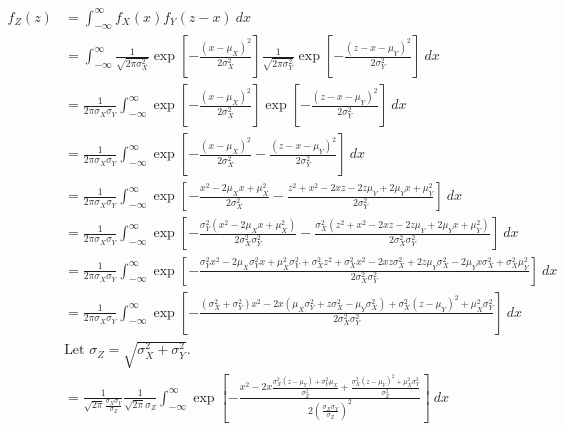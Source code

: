 \documentclass{article}
\begin{document}
{
  \allowdisplaybreaks
\begin{align*}
  f_Z(z) &= \int_{-\infty}^{\infty} f_X(x) f_Y(z - x) \: dx \\
  &= \int_{-\infty}^{\infty} \frac{1}{\sqrt{2 \pi \sigma_X^2}} \exp \left[{-\frac{(x - \mu_X)^2}{2 \sigma_X^2}} \right] \frac{1}{\sqrt{2 \pi \sigma_Y^2}} \exp \left[{-\frac{(z - x - \mu_Y)^2}{2 \sigma_Y^2}} \right] \: dx \\[10pt]
  &= \frac{1}{2 \pi \sigma_X \sigma_Y} \int_{-\infty}^{\infty} \exp \left[{-\frac{(x - \mu_X)^2}{2 \sigma_X^2}} \right] \exp \left[{-\frac{(z - x - \mu_Y)^2}{2 \sigma_Y^2}} \right] \: dx \\[10pt]
  &= \frac{1}{2 \pi \sigma_X \sigma_Y} \int_{-\infty}^{\infty} \exp\left[{-\frac{(x - \mu_X)^2}{2 \sigma_X^2} - \frac{(z - x - \mu_Y)^2}{2 \sigma_Y^2}} \right] \: dx \\[10pt]
  &= \frac{1}{2 \pi \sigma_X \sigma_Y} \int_{-\infty}^{\infty} \exp\left[{-\frac{x^2 - 2 \mu_X x + \mu_X^2}{2 \sigma_X^2} - \frac{z^2 + x^2 - 2 x z - 2 z \mu_Y + 2 \mu_Y x + \mu_Y^2}{2 \sigma_Y^2}} \right] \: dx \\[10pt]
  &= \frac{1}{2 \pi \sigma_X \sigma_Y} \int_{-\infty}^{\infty} \exp\left[{-\frac{\sigma_Y^2(x^2 - 2 \mu_X x + \mu_X^2)}{2 \sigma_X^2 \sigma_Y^2} - \frac{\sigma_X^2(z^2 + x^2 - 2 x z - 2 z \mu_Y + 2 \mu_Y x + \mu_Y^2)}{2 \sigma_X^2 \sigma_Y^2 }} \right] \: dx \\[10pt]
  &= \frac{1}{2 \pi \sigma_X \sigma_Y} \int_{-\infty}^{\infty} \exp\left[{-\frac{\sigma_Y^2 x^2 - 2 \mu_X \sigma_Y^2 x + \mu_X^2 \sigma_Y^2 + \sigma_X^2 z^2 + \sigma_X^2 x^2 - 2xz\sigma_X^2 + 2 z \mu_Y \sigma_X^2 - 2\mu_Y x \sigma_X^2 + \sigma_X^2 \mu_Y^2}{2 \sigma_X^2 \sigma_Y^2}} \right] \: dx \\[10pt]
  &= \frac{1}{2 \pi \sigma_X \sigma_Y} \int_{-\infty}^{\infty} \exp\left[{-\frac{\left(\sigma_X^2 + \sigma_Y^2\right) x^2 - 2 x \left( \mu_X \sigma_Y^2 + z \sigma_X^2 - \mu_Y \sigma_X^2 \right) + \sigma_X^2 \left( z - \mu_Y \right)^2 + \mu_X^2 \sigma_Y^2}{2 \sigma_X^2 \sigma_Y^2}} \right] \: dx \\[10pt]
  &\text{Let $\sigma_Z = \sqrt{\sigma_X^2 + \sigma_Y^2}$}. \\
  &= \frac{1}{\sqrt{2 \pi} \frac{\sigma_X \sigma_Y}{\sigma_Z}} \frac{1}{\sqrt{2 \pi} \sigma_Z} \int_{-\infty}^{\infty} \exp\left[{-\frac{x^2 - 2x \frac{\sigma_X^2 (z - \mu_Y) + \sigma_Y^2 \mu_X}{\sigma_Z^2} + \frac{\sigma_X^2 \left( z - \mu_Y \right)^2 + \mu_X^2 \sigma_Y^2}{\sigma_Z^2}}{2 \left(\frac{\sigma_X \sigma_Y}{\sigma_Z}\right)^2}} \right] \: dx \\[10pt]

\end{align*}}
\end{document}
